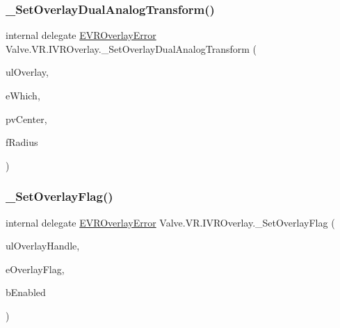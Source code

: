 \mbox{\label{struct_valve_1_1_v_r_1_1_i_v_r_overlay_ae1a52476bb06ce07f2f80b32bac7b577}} 
\subsubsection{\texorpdfstring{\_SetOverlayDualAnalogTransform()}{\_SetOverlayDualAnalogTransform()}}
{\footnotesize\ttfamily internal delegate \mbox{\hyperlink{namespace_valve_1_1_v_r_aaee5c5144f42b7969d45b854f51b0c18}{E\+V\+R\+Overlay\+Error}} Valve.\+V\+R.\+I\+V\+R\+Overlay.\+\_\+\+Set\+Overlay\+Dual\+Analog\+Transform (\begin{DoxyParamCaption}\item[{ulong}]{ul\+Overlay,  }\item[{\mbox{\hyperlink{namespace_valve_1_1_v_r_a3a5fe210bea8b993a1ad42f680119e90}{E\+Dual\+Analog\+Which}}}]{e\+Which,  }\item[{ref \mbox{\hyperlink{struct_valve_1_1_v_r_1_1_hmd_vector2__t}{Hmd\+Vector2\+\_\+t}}}]{pv\+Center,  }\item[{float}]{f\+Radius }\end{DoxyParamCaption})}

\mbox{\label{struct_valve_1_1_v_r_1_1_i_v_r_overlay_a4640d4e761c851e4673dbabf21915b14}} 
\subsubsection{\texorpdfstring{\_SetOverlayFlag()}{\_SetOverlayFlag()}}
{\footnotesize\ttfamily internal delegate \mbox{\hyperlink{namespace_valve_1_1_v_r_aaee5c5144f42b7969d45b854f51b0c18}{E\+V\+R\+Overlay\+Error}} Valve.\+V\+R.\+I\+V\+R\+Overlay.\+\_\+\+Set\+Overlay\+Flag (\begin{DoxyParamCaption}\item[{ulong}]{ul\+Overlay\+Handle,  }\item[{\mbox{\hyperlink{namespace_valve_1_1_v_r_a34c8e00ad63b95c5f533b1387bcab6ff}{V\+R\+Overlay\+Flags}}}]{e\+Overlay\+Flag,  }\item[{bool}]{b\+Enabled }\end{DoxyParamCaption})}

